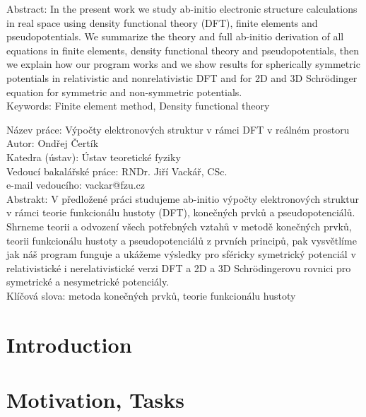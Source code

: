 \documentclass[12pt,notitlepage]{report}
\begin{document}
\noindent Abstract: In the present work we study ab-initio electronic structure
calculations in real space using density functional theory (DFT), finite
elements and pseudopotentials. We summarize the theory and full ab-initio
derivation of all equations in finite elements, density functional theory and
pseudopotentials, then we explain how our program works and we show results for
spherically symmetric potentials in relativistic and nonrelativistic DFT and
for 2D and 3D Schr\"odinger equation for symmetric and non-symmetric
potentials. \\

\noindent Keywords: Finite element method, Density functional theory

\vspace{10mm}

\noindent
Název práce: Výpočty elektronových struktur v rámci DFT v reálném prostoru\\
Autor: Ondřej Čertík\\
Katedra (ústav): Ústav teoretické fyziky\\
Vedoucí bakalářské práce: RNDr. Jiří Vackář, CSc.\\
e-mail vedoucího: vackar@fzu.cz\\

\noindent Abstrakt:  V předložené práci studujeme ab-initio výpočty
elektronových struktur v rámci teorie funkcionálu hustoty (DFT), konečných
prvků a pseudopotenciálů. Shrneme teorii a odvození všech potřebných vztahů v
metodě konečných prvků, teorii funkcionálu hustoty a pseudopotenciálů z prvních
principů, pak vysvětlíme jak náš program funguje a ukážeme výsledky pro
sféricky symetrický potenciál v relativistické i nerelativistické verzi DFT a
2D a 3D Schrödingerovu rovnici pro symetrické a nesymetrické potenciály. \\

\noindent Klíčová slova: metoda konečných prvků, teorie funkcionálu hustoty

\tableofcontents %

\newpage

\chapter{Introduction}



\chapter{Motivation, Tasks}
\end{document}
